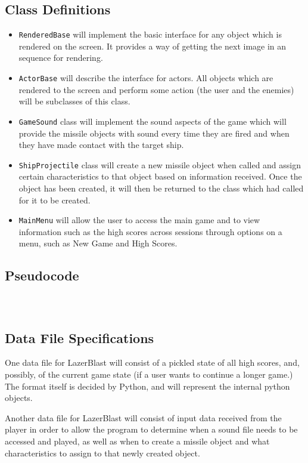 \subsection*{Class Definitions}
    \begin{itemize}
        \item \texttt{RenderedBase} will implement the basic
        interface for any object which is rendered on the screen.
        It provides a way of getting the next image in an sequence
        for rendering.
        \item \texttt{ActorBase} will describe the interface
        for actors.  All objects which are rendered to the screen and
        perform some action (the user and the enemies) will be subclasses
        of this class.
        \item \texttt{GameSound} class will implement
        the sound aspects of the game which will provide the
        missile objects with sound every time they are fired and
        when they have made contact with the target
        ship.
        \item \texttt{ShipProjectile} class will create
        a new missile object when called and assign certain
        characteristics to that object based on information
        received. Once the object has been created, it will then
        be returned to the class which had called for it to be created.
        \item \texttt{MainMenu} will allow the user to access
        the main game and to view information such as the high scores
        across sessions through options on a menu, such as New Game and
        High Scores.
    \end{itemize}

\subsection*{Pseudocode}
    \inputminted{python}{../assets/base_classes.py}
    \inputminted{python}{../assets/menus.py}

    \inputminted{python}{../assets/sounds_and_projectiles.py}

\subsection*{Data File Specifications}
    One data file for LazerBlast will consist of a
    pickled state of all high scores, and, possibly,
    of the current game state (if a user wants to
    continue a longer game.)  The format itself is
    decided by Python, and will represent the internal
    python objects.

    Another data file for LazerBlast will consist of input data received
    from the player in order to allow the program to determine when
    a sound file needs to be accessed and played, as well as when to
    create a missile object and what characteristics to assign to
    that newly created object.
